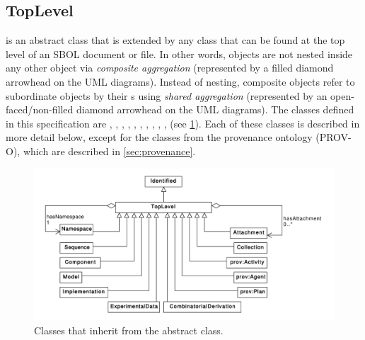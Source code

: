 \subsection {TopLevel}
\label{sec:TopLevel}
 is an abstract class that is extended by any  class that can be found at the top level of an SBOL document or file.
In other words,  objects are not nested inside any other object via \textit{composite aggregation} (represented by a filled diamond arrowhead on the UML diagrams).
Instead of nesting, composite  objects refer to subordinate  objects by their s using \textit{shared aggregation} (represented by an open-faced/non-filled diamond arrowhead on the UML diagrams).
The  classes defined in this specification are , , , , , , , , , ,  (see \ref{uml:toplevel}).
Each of these classes is described in more detail below, except for the classes from the provenance ontology (PROV-O), which are described in \ref{sec:provenance}.


\begin{figure}[ht]
\begin{center}
\includegraphics[width=\textwidth]{uml/toplevel}
\caption[]{Classes that inherit from the  abstract class.}
\label{uml:toplevel}
\end{center}
\end{figure}



